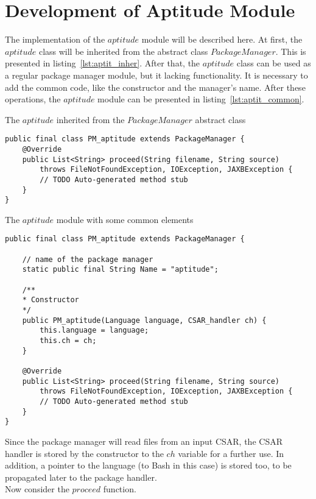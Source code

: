 \section{Development of Aptitude Module}\label{sec:aptitude_imp}
The implementation of the $aptitude$ module will be described here.
At first, the $aptitude$ class will be inherited from the abstract class $PackageManager$. 
This is presented in listing~\ref{lst:aptit_inher}. %
After that, the $aptitude$ class can be used as a regular package manager module, but it lacking functionality.
It is necessary to add the common code, like the constructor and the manager's name.
After these operations, the $aptitude$ module can be presented in listing~\ref{lst:aptit_common}. %
\begin{Listing} 
	\caption{The $aptitude$ inherited from the $PackageManager$ abstract class}
	\label{lst:aptit_inher}
\begin{lstlisting}
public final class PM_aptitude extends PackageManager {
	@Override
	public List<String> proceed(String filename, String source)
		throws FileNotFoundException, IOException, JAXBException {
		// TODO Auto-generated method stub
	}
}
\end{lstlisting}
\end{Listing} 
\begin{Listing} 
\caption{The $aptitude$ module with some common elements}
\label{lst:aptit_common}
\begin{lstlisting}
public final class PM_aptitude extends PackageManager {

	// name of the package manager
	static public final String Name = "aptitude";
	
	/**
	* Constructor
	*/
	public PM_aptitude(Language language, CSAR_handler ch) {
		this.language = language;
		this.ch = ch;
	}
	
	@Override
	public List<String> proceed(String filename, String source)
		throws FileNotFoundException, IOException, JAXBException {
		// TODO Auto-generated method stub
	}
}
\end{lstlisting}
\end{Listing} 
Since the package manager will read files from an input CSAR, the CSAR handler is stored by the constructor to the $ch$ variable for a further use.
In addition, a pointer to the language (to Bash in this case) is stored too, to be propagated later to the package handler.\\
Now consider the $proceed$ function.
